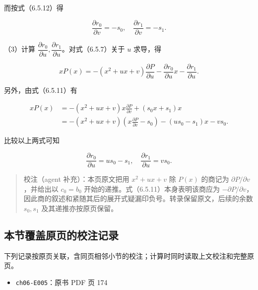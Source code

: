 \documentclass[
  10pt,
  fontset=fandol]{ctexart}
\providecommand{\tightlist}{%
  \setlength{\itemsep}{0pt}\setlength{\parskip}{0pt}}
\begin{document}
而按式（6.5.12）得

\[
\frac{\partial r_0}{\partial v}=-s_0,\quad\frac{\partial r_1}{\partial v}=-s_1.
\]

（3）计算 \(\dfrac{\partial r_0}{\partial u},\dfrac{\partial r_1}{\partial u}\)。对式（6.5.7）关于 \(u\) 求导，得

\[
xP(x)=-(x^2+ux+v)\frac{\partial P}{\partial u}-\frac{\partial r_0}{\partial u}x-\frac{\partial r_1}{\partial u}.
\]

另外，由式（6.5.11）有

\[
\begin{aligned}
xP(x)&=-(x^2+ux+v)x\frac{\partial P}{\partial v}+(s_0x+s_1)x\\
&=-(x^2+ux+v)\left(x\frac{\partial P}{\partial v}-s_0\right)-(us_0-s_1)x-vs_0.
\end{aligned}
\]

比较以上两式可知

\[
\frac{\partial r_0}{\partial u}=us_0-s_1,\quad\frac{\partial r_1}{\partial u}=vs_0.
\]

\begin{quote}
校注（agent 补充）：本页原文把用 \(x^2+ux+v\) 除 \(P(x)\) 的商记为 \(\partial P/\partial v\)，并给出以 \(c_0=b_0\) 开始的递推。式（6.5.11）本身表明该商应为 \(-\partial P/\partial v\)，因此商的叙述和紧随其后的展开式疑漏印负号。转录保留原文，后续的余数 \(s_0,s_1\) 及其递推亦按原页保留。
\end{quote}

\subsection{本节覆盖原页的校注记录}\label{ux672cux8282ux8986ux76d6ux539fux9875ux7684ux6821ux6ce8ux8bb0ux5f55}

下列记录按原页关联，含同页相邻小节的校注；计算时同时读取上文校注和完整原页。

\begin{itemize}
\tightlist
\item
  \texttt{ch06-E005}：原书 PDF 页 174
\end{itemize}
\end{document}

